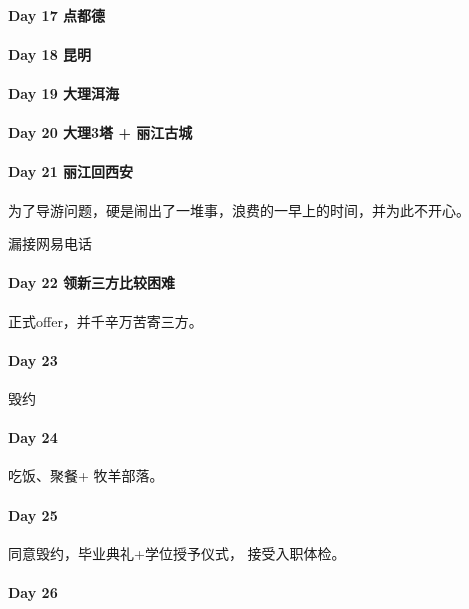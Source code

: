 \documentclass[UTF8,a4paper,8pt]{ctexart}
\begin{document}
 	 \paragraph{Day 17   点都德   \quad     }
 	 \paragraph{Day 18   昆明   \quad     }
 	 \paragraph{Day 19   大理洱海   \quad     }
 	 \paragraph{Day 20   大理3塔 + 丽江古城   \quad     }
 	 \paragraph{Day 21   丽江回西安   \quad     }
 	 	为了导游问题，硬是闹出了一堆事，浪费的一早上的时间，并为此不开心。
 	 	
 	 	漏接网易电话
 	 \paragraph{Day 22   领新三方比较困难   \quad     }
 	 
 	 	正式offer，并千辛万苦寄三方。
 	 	
 	 \paragraph{Day 23      \quad     }
 	 
 	 	毁约
 	 	
 	 \paragraph{Day 24      \quad     }
 	 
 	 	吃饭、聚餐+ 牧羊部落。
 	 	
 	 \paragraph{Day 25      \quad     }
 	 
 	 	同意毁约，毕业典礼+学位授予仪式， 接受入职体检。
 	 	
 	 \paragraph{Day 26      \quad     }
 	 
\end{document}
